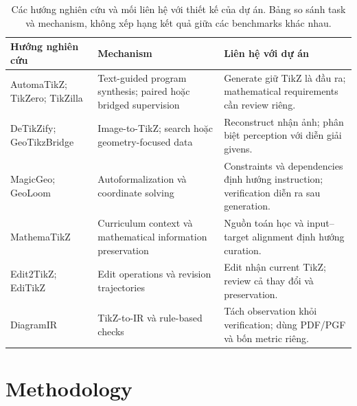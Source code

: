 \documentclass[a4paper,12pt]{article}
\begin{document}
\begin{table}[tbp]
\centering
\small
\caption{Các hướng nghiên cứu và mối liên hệ với thiết kế của dự án. Bảng so sánh task và mechanism, không xếp hạng kết quả giữa các benchmarks khác nhau.}

\label{tab:related-work}
\renewcommand{\arraystretch}{1.15}
\begin{tabularx}{\linewidth}{@{}>{\raggedright\arraybackslash}p{.29\linewidth} >{\raggedright\arraybackslash}p{.27\linewidth} >{\raggedright\arraybackslash}X@{}}
\toprule
\textbf{Hướng nghiên cứu} & \textbf{Mechanism} & \textbf{Liên hệ với dự án} \\
\midrule
AutomaTikZ; TikZero; TikZilla \cite{automat,ref1,tikzilla} & Text-guided program synthesis; paired hoặc bridged supervision & Generate giữ TikZ là đầu ra; mathematical requirements cần review riêng. \\
DeTikZify; GeoTikzBridge \cite{detikzify,geobridge} & Image-to-TikZ; search hoặc geometry-focused data & Reconstruct nhận ảnh; phân biệt perception với diễn giải givens. \\
MagicGeo; GeoLoom \cite{magicgeo,ref3} & Autoformalization và coordinate solving & Constraints và dependencies định hướng instruction; verification diễn ra sau generation. \\
MathemaTikZ \cite{mathematikz} & Curriculum context và mathematical information preservation & Nguồn toán học và input--target alignment định hướng curation. \\
Edit2TikZ; EdiTikZ \cite{edit2tikz,editikz} & Edit operations và revision trajectories & Edit nhận current TikZ; review cả thay đổi và preservation. \\
DiagramIR \cite{ref2} & TikZ-to-IR và rule-based checks & Tách observation khỏi verification; dùng PDF/PGF và bốn metric riêng. \\
\bottomrule
\end{tabularx}
\end{table}

\section{Methodology}
\label{sec:methodology}
\end{document}
